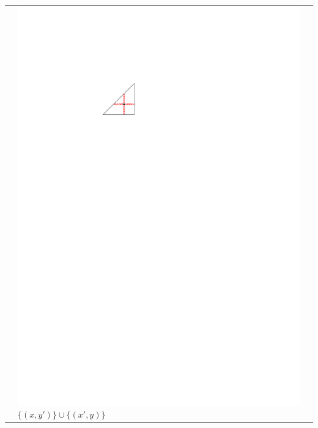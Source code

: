 \documentclass{patmorin}
\begin{document}
\begin{table}
\begin{center}
\begin{tabular}{m{1ex}|>{\centering\arraybackslash}m{}|>{\centering\arraybackslash}m{}}
         & \includegraphics[scale=.9]{figs/killersb-2} \break%
           $\{(x,y')\} \cup \{(x',y)\}$ \\

\end{tabular}
\end{center}
\end{table}
\end{document}
